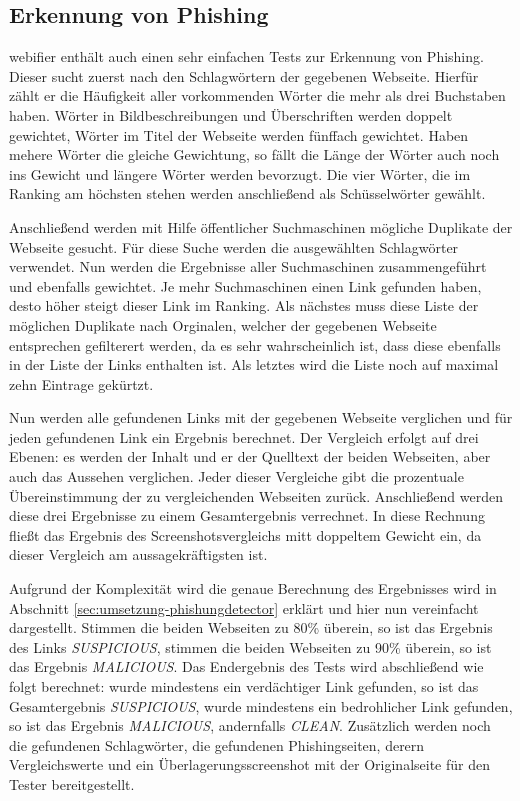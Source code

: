 \subsection{Erkennung von Phishing}

webifier enthält auch einen sehr einfachen Tests zur Erkennung von Phishing. Dieser sucht zuerst nach den Schlagwörtern der gegebenen Webseite. Hierfür zählt er die Häufigkeit aller vorkommenden Wörter die mehr als drei Buchstaben haben. Wörter in Bildbeschreibungen und Überschriften werden doppelt gewichtet, Wörter im Titel der Webseite werden fünffach gewichtet. Haben mehere Wörter die gleiche Gewichtung, so fällt die Länge der Wörter auch noch ins Gewicht und längere Wörter werden bevorzugt. Die vier Wörter, die im Ranking am höchsten stehen werden anschließend als Schüsselwörter gewählt.

Anschließend werden mit Hilfe öffentlicher Suchmaschinen mögliche Duplikate der Webseite gesucht. Für diese Suche werden die ausgewählten Schlagwörter verwendet. Nun werden die Ergebnisse aller Suchmaschinen zusammengeführt und ebenfalls gewichtet. Je mehr Suchmaschinen einen Link gefunden haben, desto höher steigt dieser Link im Ranking. Als nächstes muss diese Liste der möglichen Duplikate nach Orginalen, welcher der gegebenen Webseite entsprechen gefilterert werden, da es sehr wahrscheinlich ist, dass diese ebenfalls in der Liste der Links enthalten ist. Als letztes wird die Liste noch auf maximal zehn Eintrage gekürtzt.

Nun werden alle gefundenen Links mit der gegebenen Webseite verglichen und für jeden gefundenen Link ein Ergebnis berechnet. Der Vergleich erfolgt auf drei Ebenen: es werden der Inhalt und er der Quelltext der beiden Webseiten, aber auch das Aussehen verglichen. Jeder dieser Vergleiche gibt die prozentuale Übereinstimmung der zu vergleichenden Webseiten zurück. Anschließend werden diese drei Ergebnisse zu einem Gesamtergebnis verrechnet. In diese Rechnung fließt das Ergebnis des Screenshotsvergleichs mitt doppeltem Gewicht ein, da dieser Vergleich am aussagekräftigsten ist.

Aufgrund der Komplexität wird die genaue Berechnung des Ergebnisses wird in Abschnitt \ref{sec:umsetzung-phishungdetector} erklärt und hier nun vereinfacht dargestellt. Stimmen die beiden Webseiten zu 80\% überein, so ist das Ergebnis des Links \textit{SUSPICIOUS}, stimmen die beiden Webseiten zu 90\% überein, so ist das Ergebnis \textit{MALICIOUS}. Das Endergebnis des Tests wird abschließend wie folgt berechnet: wurde mindestens ein verdächtiger Link gefunden, so ist das Gesamtergebnis \textit{SUSPICIOUS}, wurde mindestens ein bedrohlicher Link gefunden, so ist das Ergebnis \textit{MALICIOUS}, andernfalls \textit{CLEAN}. Zusätzlich werden noch die gefundenen Schlagwörter, die gefundenen Phishingseiten, derern Vergleichswerte und ein Überlagerungsscreenshot mit der Originalseite für den Tester bereitgestellt.


